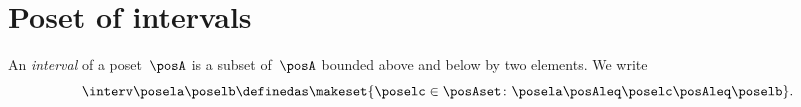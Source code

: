 
\section{Poset of intervals}
\begin{definition}[Interval]
    \label{def:interval}
    An \emph{interval} of a poset~$\posA$ is a subset of~$\posA$ bounded above and below by two elements.
    We write
    \begin{equation*}
        \interv \posela \poselb
        \definedas
        \makeset{
            \poselc \in \posAset \colon
            \posela \posAleq \poselc \posAleq \poselb
        }.
    \end{equation*}
\end{definition}

